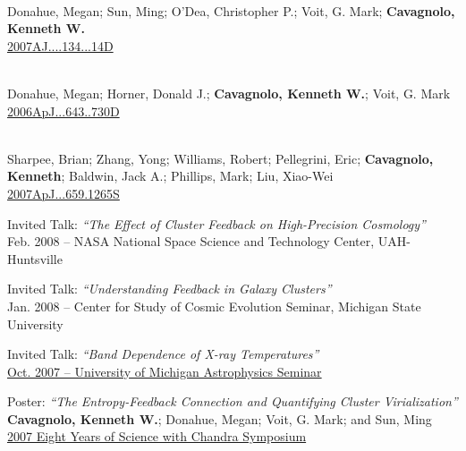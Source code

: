 \documentclass[12pt]{cv}
\begin{document}
\begin{llist}
{}\\
Donahue, Megan; Sun, Ming; O'Dea, Christopher P.; Voit, G. Mark; {\bf Cavagnolo, Kenneth W.}\\
\href{http://adsabs.harvard.edu/abs/2007AJ....134...14D}{2007AJ....134...14D}

{}\\
Donahue, Megan; Horner, Donald J.; {\bf Cavagnolo, Kenneth W.}; Voit, G. Mark\\
\href{http://adsabs.harvard.edu/abs/2006ApJ...643..730D}{2006ApJ...643..730D}

{}\\
Sharpee, Brian; Zhang, Yong; Williams, Robert; Pellegrini, Eric; {\bf Cavagnolo, Kenneth}; Baldwin, Jack A.; Phillips, Mark; Liu, Xiao-Wei\\
\href{http://adsabs.harvard.edu/abs/2007ApJ...659.1265S}{2007ApJ...659.1265S}



{\sc Invited Talk: {\textit{``The Effect of Cluster Feedback on High-Precision Cosmology''}}}\\
Feb. 2008 -- NASA National Space Science and Technology Center, UAH-Huntsville

{\sc Invited Talk: {\textit{``Understanding Feedback in Galaxy Clusters''}}}\\
Jan. 2008 -- Center for Study of Cosmic Evolution Seminar, Michigan State University

{\sc Invited Talk: {\textit{``Band Dependence of X-ray Temperatures''}}}\\
\href{http://www.pa.msu.edu/people/cavagnolo/annarbor_07.pdf}{Oct. 2007 -- University of Michigan Astrophysics Seminar}

{\sc Poster: {\textit{``The Entropy-Feedback Connection and Quantifying Cluster Virialization''}}}\\
{\bf Cavagnolo, Kenneth W.}; Donahue, Megan; Voit, G. Mark; and Sun, Ming\\
\href{http://cxc.harvard.edu/symposium_2007/proceedings/posters//074_Cavagnolo.pdf}{2007
Eight Years of Science with Chandra Symposium}


\end{llist}
\end{document}
